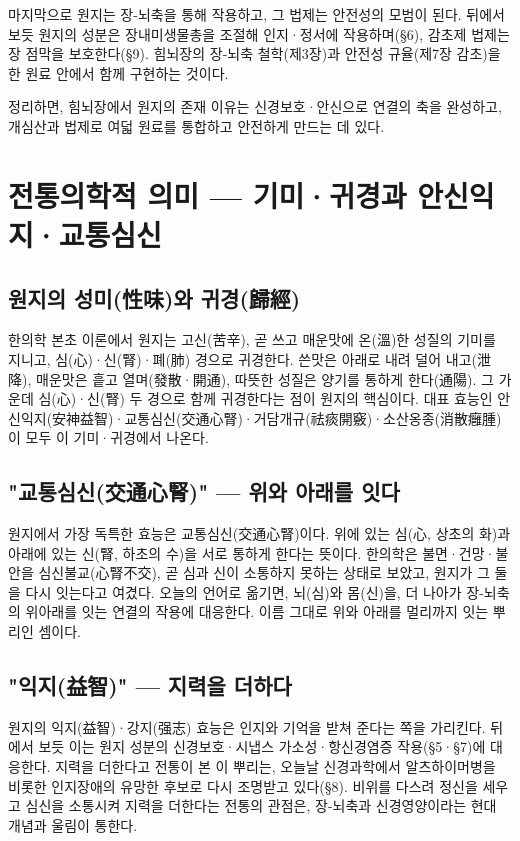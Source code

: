 \documentclass[12pt,oneside]{book}
\begin{document}
마지막으로 원지는 장-뇌축을 통해 작용하고, 그 법제는 안전성의 모범이 된다. 뒤에서 보듯 원지의 성분은 장내미생물총을 조절해 인지·정서에 작용하며(§6), 감초제 법제는 장 점막을 보호한다(§9). 힘뇌장의 장-뇌축 철학(제3장)과 안전성 규율(제7장 감초)을 한 원료 안에서 함께 구현하는 것이다.

정리하면, 힘뇌장에서 원지의 존재 이유는 신경보호·안신으로 연결의 축을 완성하고, 개심산과 법제로 여덟 원료를 통합하고 안전하게 만드는 데 있다.

\section{전통의학적 의미 — 기미·귀경과 안신익지·교통심신}

\subsection{원지의 성미(性味)와 귀경(歸經)}

한의학 본초 이론에서 원지는 고신(苦辛), 곧 쓰고 매운맛에 온(溫)한 성질의 기미를 지니고, 심(心)·신(腎)·폐(肺) 경으로 귀경한다. 쓴맛은 아래로 내려 덜어 내고(泄降), 매운맛은 흩고 열며(發散·開通), 따뜻한 성질은 양기를 통하게 한다(通陽). 그 가운데 심(心)·신(腎) 두 경으로 함께 귀경한다는 점이 원지의 핵심이다. 대표 효능인 안신익지(安神益智)·교통심신(交通心腎)·거담개규(祛痰開竅)·소산옹종(消散癰腫)이 모두 이 기미·귀경에서 나온다.

\subsection{"교통심신(交通心腎)" — 위와 아래를 잇다}

원지에서 가장 독특한 효능은 교통심신(交通心腎)이다. 위에 있는 심(心, 상초의 화)과 아래에 있는 신(腎, 하초의 수)을 서로 통하게 한다는 뜻이다. 한의학은 불면·건망·불안을 심신불교(心腎不交), 곧 심과 신이 소통하지 못하는 상태로 보았고, 원지가 그 둘을 다시 잇는다고 여겼다. 오늘의 언어로 옮기면, 뇌(심)와 몸(신)을, 더 나아가 장-뇌축의 위아래를 잇는 연결의 작용에 대응한다. 이름 그대로 위와 아래를 멀리까지 잇는 뿌리인 셈이다.

\subsection{"익지(益智)" — 지력을 더하다}

원지의 익지(益智)·강지(强志) 효능은 인지와 기억을 받쳐 준다는 쪽을 가리킨다. 뒤에서 보듯 이는 원지 성분의 신경보호·시냅스 가소성·항신경염증 작용(§5·§7)에 대응한다. 지력을 더한다고 전통이 본 이 뿌리는, 오늘날 신경과학에서 알츠하이머병을 비롯한 인지장애의 유망한 후보로 다시 조명받고 있다(§8). 비위를 다스려 정신을 세우고 심신을 소통시켜 지력을 더한다는 전통의 관점은, 장-뇌축과 신경영양이라는 현대 개념과 울림이 통한다.
\end{document}
